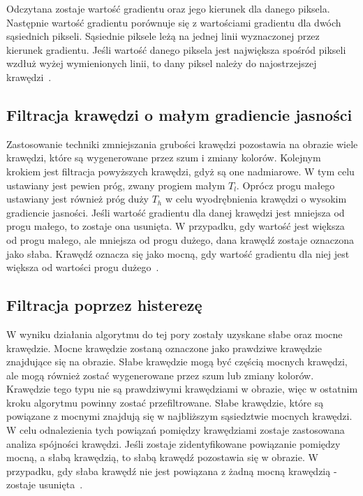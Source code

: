 \documentclass[a4paper,twoside,12pt]{book}
\begin{document}
    Odczytana zostaje wartość gradientu oraz jego kierunek dla danego piksela.
    Następnie wartość gradientu porównuje się z wartościami gradientu dla
    dwóch sąsiednich pikseli.
    Sąsiednie piksele leżą na jednej linii wyznaczonej przez kierunek gradientu.
    Jeśli wartość danego piksela jest największa spośród pikseli wzdłuż wyżej wymienionych linii,
    to dany piksel należy do najostrzejszej krawędzi~\cite{Canny}.

    \subsection*{Filtracja krawędzi o małym gradiencie jasności}
    Zastosowanie techniki zmniejszania grubości krawędzi pozostawia na obrazie wiele krawędzi, które są wygenerowane przez szum i zmiany
    kolorów.
    Kolejnym krokiem jest filtracja powyższych krawędzi, gdyż są one nadmiarowe.
    W tym celu ustawiany jest pewien próg, zwany progiem małym $T_{l}$.
    Oprócz progu małego ustawiany jest również próg duży $T_{h}$ w celu wyodrębnienia krawędzi o wysokim gradiencie
    jasności.
    Jeśli wartość gradientu dla danej krawędzi jest mniejsza od progu małego, to zostaje ona usunięta.
    W przypadku, gdy wartość jest większa od progu małego, ale mniejsza od progu dużego, dana krawędź
    zostaje oznaczona jako słaba.
    Krawędź oznacza się jako mocną, gdy wartość gradientu dla niej jest większa od wartości progu dużego~\cite{Canny}.

    \subsection*{Filtracja poprzez histerezę}\label{subsec:filtracja-poprzez-histerezę}
    W wyniku działania algorytmu do tej pory zostały uzyskane słabe oraz mocne krawędzie.
    Mocne krawędzie zostaną oznaczone jako prawdziwe krawędzie znajdujące się na obrazie.
    Słabe krawędzie mogą być częścią mocnych krawędzi, ale
    mogą również zostać wygenerowane przez szum lub zmiany kolorów.
    Krawędzie tego typu nie są prawdziwymi krawędziami w obrazie, więc w ostatnim kroku algorytmu powinny zostać
    przefiltrowane.
    Słabe krawędzie, które są powiązane z mocnymi znajdują się w najbliższym sąsiedztwie mocnych krawędzi.
    W celu odnalezienia tych powiązań pomiędzy krawędziami zostaje zastosowana analiza spójności krawędzi.
    Jeśli zostaje zidentyfikowane powiązanie pomiędzy mocną, a słabą krawędzią, to słabą krawędź pozostawia się w obrazie.
    W przypadku, gdy słaba krawędź nie jest powiązana z żadną mocną krawędzią - zostaje usunięta~\cite{Canny}.
\end{document}
